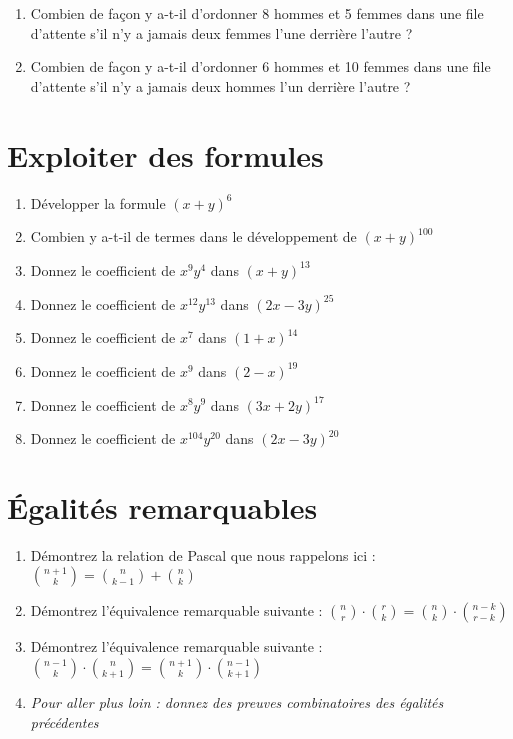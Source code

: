 \documentclass[a4paper,11pt]{article}
\begin{document}
\begin{enumerate}
\item Combien de façon y a-t-il d'ordonner 8 hommes et 5 femmes dans une file d'attente s'il n'y a jamais deux femmes l'une derrière l'autre ?

\item Combien de façon y a-t-il d'ordonner 6 hommes et 10 femmes dans une file d'attente s'il n'y a jamais deux hommes l'un derrière l'autre ?
\end{enumerate}

\section{Exploiter des formules}

\begin{enumerate}
\item Développer la formule $(x + y)^6$

\item Combien y a-t-il de termes dans le développement de $(x + y)^{100}$

\item Donnez le coefficient de $x^9y^4$ dans $(x + y)^{13}$

\item Donnez le coefficient de $x^{12}y^{13}$ dans $(2x - 3y)^{25}$

\item Donnez le coefficient de $x^7$ dans $(1 + x)^{14}$

\item Donnez le coefficient de $x^9$ dans $(2 - x)^{19}$

\item Donnez le coefficient de $x^8y^9$ dans $(3x + 2y)^{17}$

\item Donnez le coefficient de $x^{104}y^{20}$ dans $(2x - 3y)^{20}$
\end{enumerate}

\section{Égalités remarquables}

\begin{enumerate}
\item Démontrez la relation de Pascal que nous rappelons ici : $\binom{n+1}{k} = \binom{n}{k-1} + \binom{n}{k}$

\item Démontrez l'équivalence remarquable suivante : $\binom{n}{r} \cdot \binom{r}{k} = \binom{n}{k} \cdot \binom{n-k}{r-k}$

\item Démontrez l'équivalence remarquable suivante : $\binom{n-1}{k} \cdot \binom{n}{k+1} = \binom{n+1}{k} \cdot \binom{n-1}{k+1}$

\item \emph{Pour aller plus loin : donnez des preuves combinatoires des égalités précédentes}
\end{enumerate}
\end{document}
